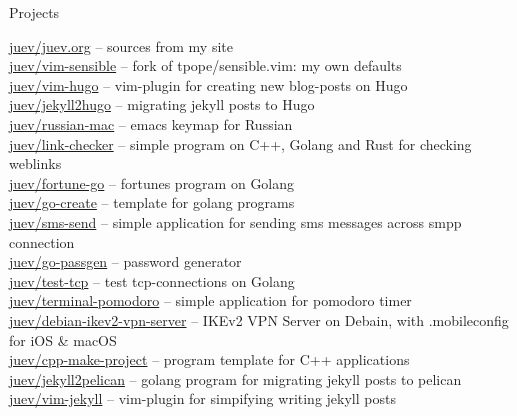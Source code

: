 \documentclass{resume} %
\begin{document}

\begin{rSection}{Projects}

\href{https://github.com/juev/juev.org}{juev/juev.org} -- sources from my site \\ %
\href{https://github.com/juev/vim-sensible}{juev/vim-sensible} -- fork of tpope/sensible.vim: my own defaults \\ %
\href{https://github.com/juev/vim-hugo}{juev/vim-hugo} -- vim-plugin for creating new blog-posts on Hugo \\ %
\href{https://github.com/juev/jekyll2hugo}{juev/jekyll2hugo} -- migrating jekyll posts to Hugo \\ %
\href{https://github.com/juev/russian-mac}{juev/russian-mac} -- emacs keymap for Russian \\ %
\href{https://github.com/juev/link-checker}{juev/link-checker} -- simple program on C++, Golang and Rust for checking weblinks \\ %
\href{https://github.com/juev/fortune-go}{juev/fortune-go} -- fortunes program on Golang \\ %
\href{https://github.com/juev/go-create}{juev/go-create} -- template for golang programs \\ %
\href{https://github.com/juev/sms-send}{juev/sms-send} -- simple application for sending sms messages across smpp connection \\ %
\href{https://github.com/juev/go-passgen}{juev/go-passgen} -- password generator \\ %
\href{https://github.com/juev/test-tcp}{juev/test-tcp} -- test tcp-connections on Golang \\ %
\href{https://github.com/juev/terminal-pomodoro}{juev/terminal-pomodoro} -- simple application for pomodoro timer \\ %
\href{https://github.com/juev/debian-ikev2-vpn-server}{juev/debian-ikev2-vpn-server} -- IKEv2 VPN Server on Debain, with .mobileconfig for iOS \& macOS \\ %
\href{https://github.com/juev/cpp-make-project}{juev/cpp-make-project} -- program template for C++ applications \\ %
\href{https://github.com/juev/jekyll2pelican}{juev/jekyll2pelican} -- golang program for migrating jekyll posts to pelican \\ %
\href{https://github.com/juev/vim-jekyll}{juev/vim-jekyll} -- vim-plugin for simpifying writing jekyll posts \\ %

\end{rSection}
\end{document}
